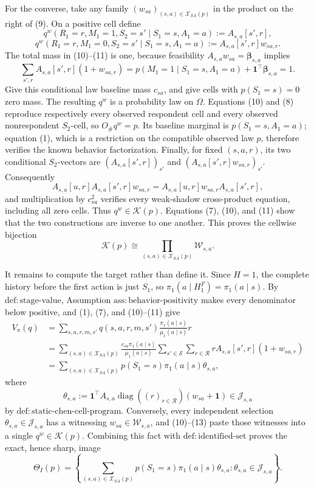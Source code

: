For the converse, take any family \((w_{sa})_{(s,a)\in\mathcal X_{SA}(p)}\) in the product on the right of (9). On a positive cell define
\[
q^w(R_1=r,M_1=1,S_2=s'\mid S_1=s,A_1=a)
:=A_{s,a}[s',r],
\tag{10}
\]
\[
q^w(R_1=r,M_1=0,S_2=s'\mid S_1=s,A_1=a)
:=A_{s,a}[s',r]w_{sa,r}.
\tag{11}
\]
The total mass in (10)--(11) is one, because feasibility \(A_{s,a}w_{sa}=\boldsymbol\beta_{s,a}\) implies
\[
\sum_{s',r}A_{s,a}[s',r](1+w_{sa,r})
=p(M_1=1\mid S_1=s,A_1=a)+\mathbf 1^\top\boldsymbol\beta_{s,a}
=1.
\tag{12}
\]
Give this conditional law baseline mass \(c_{sa}\), and give cells with \(p(S_1=s)=0\) zero mass. The resulting \(q^w\) is a probability law on \(\Omega\). Equations (10) and (8) reproduce respectively every observed respondent cell and every observed nonrespondent \(S_2\)-cell, so \(O_\#q^w=p\). Its baseline marginal is \(p(S_1=s,A_1=a)\); equation (1), which is a restriction on the compatible observed law \(p\), therefore verifies the known behavior factorization. Finally, for fixed \((s,a,r)\), its two conditional \(S_2\)-vectors are \((A_{s,a}[s',r])_{s'}\) and \((A_{s,a}[s',r]w_{sa,r})_{s'}\). Consequently
\[
A_{s,a}[u,r]A_{s,a}[s',r]w_{sa,r}
=A_{s,a}[u,r]w_{sa,r}A_{s,a}[s',r],
\tag{13}
\]
and multiplication by \(c_{sa}^2\) verifies every weak-shadow cross-product equation, including all zero cells. Thus \(q^w\in\mathcal K(p)\). Equations (7), (10), and (11) show that the two constructions are inverse to one another. This proves the cellwise bijection
\[
\mathcal K(p)\cong
\prod_{(s,a)\in\mathcal X_{SA}(p)}\mathcal W_{s,a}.
\tag{14}
\]

It remains to compute the target rather than define it. Since \(H=1\), the complete history before the first action is just \(S_1\), so \(\pi_1(a\mid H_1^F)=\pi_1(a\mid s)\). By \(\mathrm{def{:}stage\text{-}value}\), Assumption \(\mathrm{ass{:}behavior\text{-}positivity}\) makes every denominator below positive, and (1), (7), and (10)--(11) give
\[
\begin{aligned}
V_\pi(q)
&=\sum_{s,a,r,m,s'}q(s,a,r,m,s')
  \frac{\pi_1(a\mid s)}{\mu_1(a\mid s)}r\\
&=\sum_{(s,a)\in\mathcal X_{SA}(p)}
  \frac{c_{sa}\pi_1(a\mid s)}{\mu_1(a\mid s)}
  \sum_{s'\in\mathcal S}\sum_{r\in\mathcal R}
  rA_{s,a}[s',r](1+w_{sa,r})\\
&=\sum_{(s,a)\in\mathcal X_{SA}(p)}
  p(S_1=s)\pi_1(a\mid s)\theta_{s,a},
\end{aligned}
\tag{15}
\]
where
\[
\theta_{s,a}
:=\mathbf 1^\top A_{s,a}\operatorname{diag}((r)_{r\in\mathcal R})(w_{sa}+\mathbf 1)
\in\mathcal J_{s,a}
\tag{16}
\]
by \(\mathrm{def{:}static\text{-}chen\text{-}cell\text{-}program}\). Conversely, every independent selection \(\theta_{s,a}\in\mathcal J_{s,a}\) has a witnessing \(w_{sa}\in\mathcal W_{s,a}\), and (10)--(13) paste those witnesses into a single \(q^w\in\mathcal K(p)\). Combining this fact with \(\mathrm{def{:}identified\text{-}set}\) proves the exact, hence sharp, image
\[
\Theta_I(p)=
\left\{
\sum_{(s,a)\in\mathcal X_{SA}(p)}
p(S_1=s)\pi_1(a\mid s)\theta_{s,a}:
\theta_{s,a}\in\mathcal J_{s,a}
\right\}.
\tag{17}
\]

